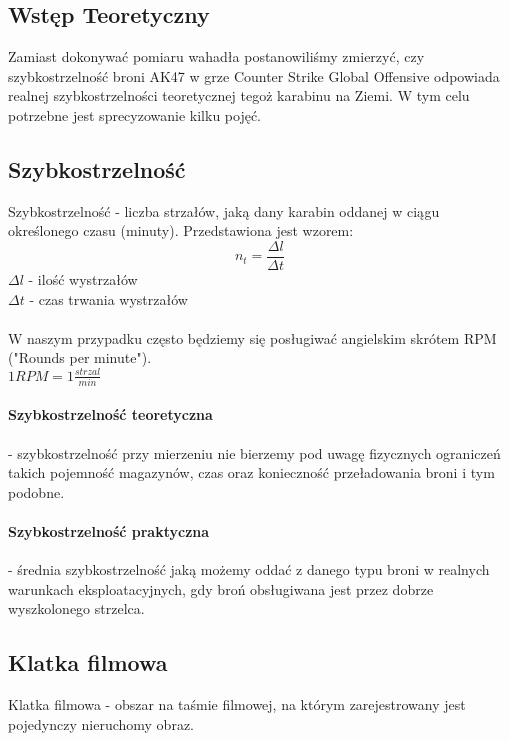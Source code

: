 \documentclass[a4paper,12pt]{article}
\begin{document}
\begin{justify}

\section{Wstęp Teoretyczny}
\label{theory}

Zamiast dokonywać pomiaru wahadła postanowiliśmy zmierzyć, czy szybkostrzelność broni AK47 w grze Counter Strike Global Offensive odpowiada realnej szybkostrzelności teoretycznej tegoż karabinu na Ziemi. W tym celu potrzebne jest sprecyzowanie kilku pojęć.

\subsection{Szybkostrzelność}
Szybkostrzelność - liczba strzałów, jaką dany karabin oddanej w ciągu określonego czasu (minuty). Przedstawiona jest wzorem:
\begin{equation}
n_{t} = \frac{\Delta l}{\Delta t}
\label{szybkostrzelnosc}
\end{equation}
$\Delta l$ - ilość wystrzałów \\
$\Delta t$ - czas trwania wystrzałów  \\ \, \\
W naszym przypadku często będziemy się posługiwać angielskim skrótem RPM ("Rounds per minute").  \cite{urlszybkostrzelnosc} \\
$1 RPM = 1 \frac{strzal}{min}$

\paragraph{Szybkostrzelność teoretyczna} - szybkostrzelność przy mierzeniu nie bierzemy pod uwagę fizycznych ograniczeń takich pojemność magazynów, czas oraz konieczność przeładowania broni i tym podobne. \cite{urlszybkostrzelnosc}

\paragraph{Szybkostrzelność praktyczna} - średnia szybkostrzelność jaką możemy oddać z danego typu broni w realnych warunkach eksploatacyjnych, gdy broń obsługiwana jest przez dobrze wyszkolonego strzelca. \cite{urlszybkostrzelnosc}

\subsection{Klatka filmowa} 
Klatka filmowa - obszar na taśmie filmowej, na którym zarejestrowany jest pojedynczy nieruchomy obraz. \cite{urlklatkafilmowa}


\end{justify}
\end{document}
